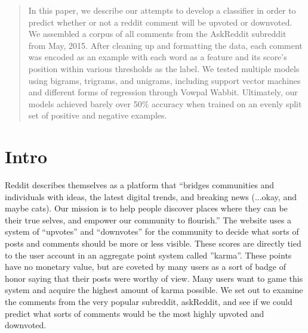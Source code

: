 \documentclass{article}
\begin{document}
 


\begin{abstract} 
In this paper, we describe our attempts to develop a classifier in order to predict whether or not a reddit comment will be upvoted or downvoted. We assembled a corpus of all comments from the AskReddit subreddit from May, 2015. After cleaning up and formatting the data, each comment was encoded as an example with each word as a feature and its score's position within various thresholds as the label. We tested multiple models using bigrams, trigrams, and unigrams, including support vector machines and different forms of regression through Vowpal Wabbit. Ultimately, our models achieved barely over 50\% accuracy when trained on an evenly split set of positive and negative examples.
\end{abstract} 

\section{Intro}
Reddit describes themselves as a platform that ``bridges communities and individuals with ideas, the latest digital trends, and breaking news (...okay, and maybe cats). Our mission is to help people discover places where they can be their true selves, and empower our community to flourish.'' \cite{redditCite} The website uses a system of ``upvotes'' and ``downvotes'' for the community to decide what sorts of posts and comments should be more or less visible. These scores are directly tied to the user account in an aggregate point system called ''karma''. These points have no monetary value, but are coveted by many users as a sort of badge of honor saying that their posts were worthy of view. Many users want to game this system and acquire the highest amount of karma possible. We set out to examine the comments from the very popular subreddit, askReddit, and see if we could predict what sorts of comments would be the most highly upvoted and downvoted. 
\end{document}
